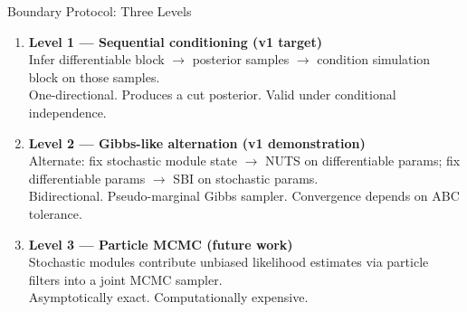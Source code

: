 \documentclass[aspectratio=169]{beamer}
\begin{document}
\begin{frame}[noframenumbering]{Boundary Protocol: Three Levels}
	\begin{enumerate}\itemsep8pt
		\item \textbf{Level 1 --- Sequential conditioning (v1 target)}\\
		Infer differentiable block $\to$ posterior samples $\to$ condition simulation block on those samples.\\
		{\small One-directional. Produces a cut posterior. Valid under conditional independence.}

		\item \textbf{Level 2 --- Gibbs-like alternation (v1 demonstration)}\\
		Alternate: fix stochastic module state $\to$ NUTS on differentiable params; fix differentiable params $\to$ SBI on stochastic params.\\
		{\small Bidirectional. Pseudo-marginal Gibbs sampler. Convergence depends on ABC tolerance.}

		\item \textbf{Level 3 --- Particle MCMC (future work)}\\
		Stochastic modules contribute unbiased likelihood estimates via particle filters into a joint MCMC sampler.\\
		{\small Asymptotically exact. Computationally expensive.}
	\end{enumerate}
\end{frame}
\end{document}
